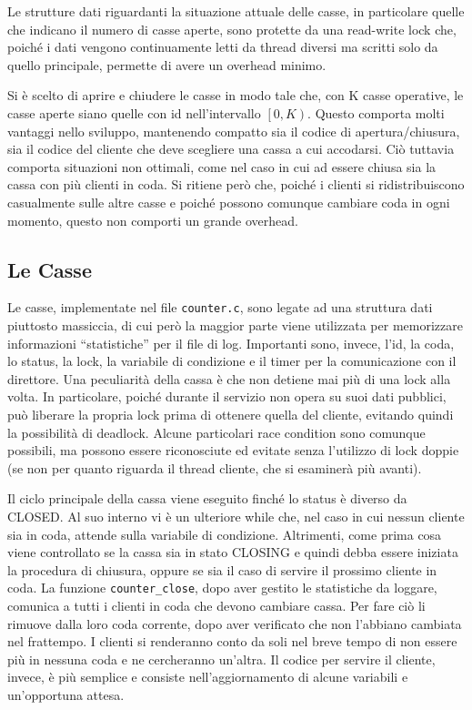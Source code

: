 \documentclass[a4paper,11pt] {article}
\begin{document}
Le strutture dati riguardanti la situazione attuale delle casse, in particolare quelle che indicano il numero di casse aperte, sono protette da una read-write lock che, poiché i dati vengono continuamente letti da thread diversi ma scritti solo da quello principale, permette di avere un overhead minimo.

Si è scelto di aprire e chiudere le casse in modo tale che, con K casse operative, le casse aperte siano quelle con id nell'intervallo $\left[0,K\right)$. Questo comporta molti vantaggi nello sviluppo, mantenendo compatto sia il codice di apertura/chiusura, sia il codice del cliente che deve scegliere una cassa a cui accodarsi. Ciò tuttavia comporta situazioni non ottimali, come nel caso in cui ad essere chiusa sia la cassa con più clienti in coda. Si ritiene però che, poiché i clienti si ridistribuiscono casualmente sulle altre casse e poiché possono comunque cambiare coda in ogni momento, questo non comporti un grande overhead.

\subsection*{Le Casse}

Le casse, implementate nel file \lstinline{counter.c}, sono legate ad una struttura dati piuttosto massiccia, di cui però la maggior parte viene utilizzata per memorizzare informazioni ``statistiche'' per il file di log. Importanti sono, invece, l'id, la coda, lo status, la lock, la variabile di condizione e il timer per la comunicazione con il direttore. Una peculiarità della cassa è che non detiene mai più di una lock alla volta. In particolare, poiché durante il servizio non opera su suoi dati pubblici, può liberare la propria lock prima di ottenere quella del cliente, evitando quindi la possibilità di deadlock. Alcune particolari race condition sono comunque possibili, ma possono essere riconosciute ed evitate senza l'utilizzo di lock doppie (se non per quanto riguarda il thread cliente, che si esaminerà più avanti).

Il ciclo principale della cassa viene eseguito finché lo status è diverso da CLOSED. Al suo interno vi è un ulteriore while che, nel caso in cui nessun cliente sia in coda, attende sulla variabile di condizione. Altrimenti, come prima cosa viene controllato se la cassa sia in stato CLOSING e quindi debba essere iniziata la procedura di chiusura, oppure se sia il caso di servire il prossimo cliente in coda. La funzione \lstinline{counter_close}, dopo aver gestito le statistiche da loggare, comunica a tutti i clienti in coda che devono cambiare cassa. Per fare ciò li rimuove dalla loro coda corrente, dopo aver verificato che non l'abbiano cambiata nel frattempo. I clienti si renderanno conto da soli nel breve tempo di non essere più in nessuna coda e ne cercheranno un'altra. Il codice per servire il cliente, invece, è più semplice e consiste nell'aggiornamento di alcune variabili e un'opportuna attesa.
\end{document}
